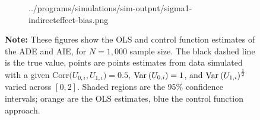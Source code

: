 \begin{figure}[h!]
\begin{subfigure}[c]{0.475\textwidth}
{            ../programs/simulations/sim-output/sigma1-indirecteffect-bias.png}
    \end{subfigure}
    \label{fig:sigma-1-bias}
    \justify
    \footnotesize    
    \textbf{Note:}
    These figures show the OLS and control function estimates of the ADE and AIE, for $N = 1,000$ sample size.
    The black dashed line is the true value, points are points estimates from data simulated with a given $\text{Corr}\big(U_{0,i}, U_{1,i}\big) =0.5$, $\text{Var}_{} \left( U_{0,i} \right) = 1$, and $\text{Var}_{} \left( U_{1,i} \right)^{\frac12}$ varied across $[0, 2]$.
    Shaded regions are the 95\% confidence intervals;
    orange are the OLS estimates, blue the control function approach.
\end{figure}

%
